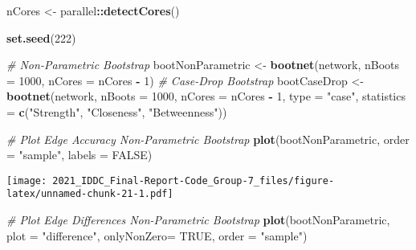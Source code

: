 \documentclass[
]{article}
\newenvironment{Shaded}{\begin{snugshade}}{\end{snugshade}}
\newcommand{\CommentTok}[1]{\textcolor[rgb]{0.56,0.35,0.01}{\textit{#1}}}
\newcommand{\DataTypeTok}[1]{\textcolor[rgb]{0.13,0.29,0.53}{#1}}
\newcommand{\DecValTok}[1]{\textcolor[rgb]{0.00,0.00,0.81}{#1}}
\newcommand{\KeywordTok}[1]{\textcolor[rgb]{0.13,0.29,0.53}{\textbf{#1}}}
\newcommand{\NormalTok}[1]{#1}
\newcommand{\OperatorTok}[1]{\textcolor[rgb]{0.81,0.36,0.00}{\textbf{#1}}}
\newcommand{\OtherTok}[1]{\textcolor[rgb]{0.56,0.35,0.01}{#1}}
\newcommand{\StringTok}[1]{\textcolor[rgb]{0.31,0.60,0.02}{#1}}
\begin{document}
\begin{Shaded}
\begin{Highlighting}[]
\NormalTok{nCores <-}\StringTok{ }\NormalTok{parallel}\OperatorTok{::}\KeywordTok{detectCores}\NormalTok{()}

\KeywordTok{set.seed}\NormalTok{(}\DecValTok{222}\NormalTok{)}

\CommentTok{# Non-Parametric Bootstrap}
\NormalTok{bootNonParametric <-}\StringTok{ }\KeywordTok{bootnet}\NormalTok{(network,}
                             \DataTypeTok{nBoots =} \DecValTok{1000}\NormalTok{,}
                             \DataTypeTok{nCores =}\NormalTok{ nCores }\OperatorTok{-}\StringTok{ }\DecValTok{1}\NormalTok{)}
\CommentTok{# Case-Drop Bootstrap}
\NormalTok{bootCaseDrop <-}\StringTok{ }\KeywordTok{bootnet}\NormalTok{(network,}
                        \DataTypeTok{nBoots =} \DecValTok{1000}\NormalTok{,}
                        \DataTypeTok{nCores =}\NormalTok{ nCores }\OperatorTok{-}\StringTok{ }\DecValTok{1}\NormalTok{,}
                        \DataTypeTok{type =} \StringTok{"case"}\NormalTok{,}
                        \DataTypeTok{statistics =} \KeywordTok{c}\NormalTok{(}\StringTok{"Strength"}\NormalTok{, }\StringTok{"Closeness"}\NormalTok{, }\StringTok{"Betweenness"}\NormalTok{))}
\end{Highlighting}
\end{Shaded}

\begin{Shaded}
\begin{Highlighting}[]
\CommentTok{# Plot Edge Accuracy Non-Parametric Bootstrap}
\KeywordTok{plot}\NormalTok{(bootNonParametric,}
     \DataTypeTok{order =} \StringTok{"sample"}\NormalTok{,}
     \DataTypeTok{labels =} \OtherTok{FALSE}\NormalTok{)}
\end{Highlighting}
\end{Shaded}

\texttt{[image: 2021\_IDDC\_Final-Report-Code\_Group-7\_files/figure-latex/unnamed-chunk-21-1.pdf]}

\begin{Shaded}
\begin{Highlighting}[]
\CommentTok{# Plot Edge Differences Non-Parametric Bootstrap}
\KeywordTok{plot}\NormalTok{(bootNonParametric,}
     \DataTypeTok{plot =} \StringTok{"difference"}\NormalTok{,}
     \DataTypeTok{onlyNonZero=} \OtherTok{TRUE}\NormalTok{,}
     \DataTypeTok{order =} \StringTok{"sample"}\NormalTok{)}
\end{Highlighting}
\end{Shaded}
\end{document}
